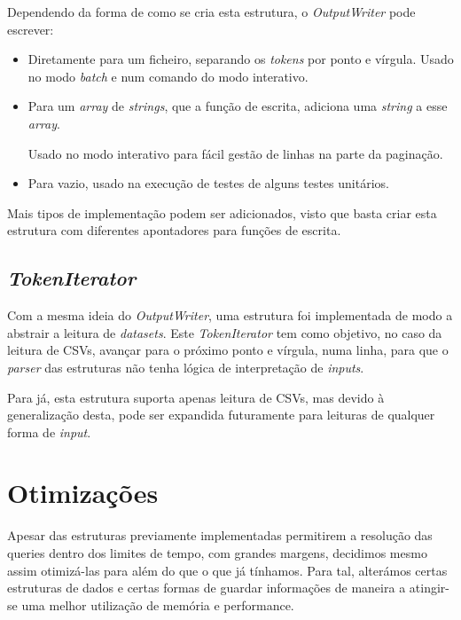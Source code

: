 \documentclass{article}
\begin{document}
            Dependendo da forma de como se cria esta estrutura, o \textit{OutputWriter} pode escrever:
            \begin{itemize}
                \item Diretamente para um ficheiro, separando os \textit{tokens} por ponto e vírgula.
                Usado no modo \textit{batch} e num comando do modo interativo.
                
                \item Para um \textit{array} de \textit{strings}, que a função de escrita, adiciona uma \textit{string} a esse \textit{array}.

                Usado no modo interativo para fácil gestão de linhas na parte da paginação.
                \item Para vazio, usado na execução de testes de alguns testes unitários.
            \end{itemize}
            Mais tipos de implementação podem ser adicionados, visto que basta criar esta
            estrutura com diferentes apontadores para funções de escrita.
        \subsection{\textit{TokenIterator}}
            Com a mesma ideia do \textit{OutputWriter}, uma estrutura foi implementada de modo a abstrair a leitura de \textit{datasets}.
            Este \textit{TokenIterator} tem como objetivo, no caso da leitura de CSVs, avançar para o próximo ponto e vírgula, numa linha,
            para que o \textit{parser} das estruturas não tenha lógica de interpretação de \textit{inputs}.
            
            Para já, esta estrutura suporta apenas leitura de CSVs, mas devido à generalização desta, 
            pode ser expandida futuramente para leituras de qualquer forma de \textit{input}.
    \section{Otimizações}
        Apesar das estruturas previamente implementadas permitirem a resolução
        das queries dentro dos limites de tempo, com grandes margens, decidimos
        mesmo assim otimizá-las para além do que o que já tínhamos. Para tal, alterámos 
        certas estruturas de dados e certas formas de guardar informações de 
        maneira a atingir-se uma melhor utilização de memória e performance.
        
\end{document}
